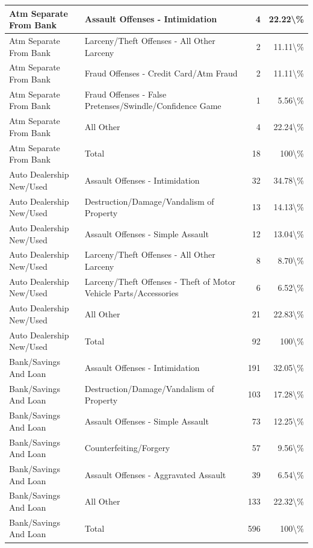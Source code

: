 \documentclass[
]{krantz}
\begin{document}
\begin{longtable}[t]{l|l|r|r}
\hline
Atm Separate From Bank & Assault Offenses - Intimidation & 4 & 22.22\textbackslash{}\%\\
\hline
Atm Separate From Bank & Larceny/Theft Offenses - All Other Larceny & 2 & 11.11\textbackslash{}\%\\
\hline
Atm Separate From Bank & Fraud Offenses - Credit Card/Atm Fraud & 2 & 11.11\textbackslash{}\%\\
\hline
Atm Separate From Bank & Fraud Offenses - False Pretenses/Swindle/Confidence Game & 1 & 5.56\textbackslash{}\%\\
\hline
Atm Separate From Bank & All Other & 4 & 22.24\textbackslash{}\%\\
\hline
Atm Separate From Bank & Total & 18 & 100\textbackslash{}\%\\
\hline
Auto Dealership New/Used & Assault Offenses - Intimidation & 32 & 34.78\textbackslash{}\%\\
\hline
Auto Dealership New/Used & Destruction/Damage/Vandalism of Property & 13 & 14.13\textbackslash{}\%\\
\hline
Auto Dealership New/Used & Assault Offenses - Simple Assault & 12 & 13.04\textbackslash{}\%\\
\hline
Auto Dealership New/Used & Larceny/Theft Offenses - All Other Larceny & 8 & 8.70\textbackslash{}\%\\
\hline
Auto Dealership New/Used & Larceny/Theft Offenses - Theft of Motor Vehicle Parts/Accessories & 6 & 6.52\textbackslash{}\%\\
\hline
Auto Dealership New/Used & All Other & 21 & 22.83\textbackslash{}\%\\
\hline
Auto Dealership New/Used & Total & 92 & 100\textbackslash{}\%\\
\hline
Bank/Savings And Loan & Assault Offenses - Intimidation & 191 & 32.05\textbackslash{}\%\\
\hline
Bank/Savings And Loan & Destruction/Damage/Vandalism of Property & 103 & 17.28\textbackslash{}\%\\
\hline
Bank/Savings And Loan & Assault Offenses - Simple Assault & 73 & 12.25\textbackslash{}\%\\
\hline
Bank/Savings And Loan & Counterfeiting/Forgery & 57 & 9.56\textbackslash{}\%\\
\hline
Bank/Savings And Loan & Assault Offenses - Aggravated Assault & 39 & 6.54\textbackslash{}\%\\
\hline
Bank/Savings And Loan & All Other & 133 & 22.32\textbackslash{}\%\\
\hline
Bank/Savings And Loan & Total & 596 & 100\textbackslash{}\%\\

\end{longtable}
\end{document}
